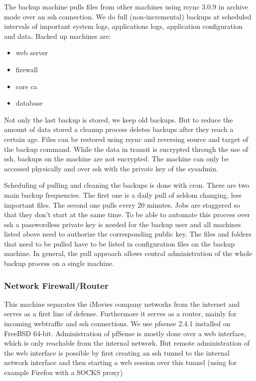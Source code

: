 \documentclass[english]{article}
\begin{document}
The backup machine pulls files from other machines using rsync 3.0.9 in archive mode over an ssh connection. We do full (non-incremental) backups at scheduled intervals of important system logs, applications logs, application configuration and data. Backed up machines are:

\begin{itemize}
    \item web server
    \item firewall
    \item core ca
    \item database
\end{itemize}

Not only the last backup is stored, we keep old backups. But to reduce the amount of data stored a cleanup process deletes backups after they reach a certain age. Files can be restored using rsync and reversing source and target of the backup command. 
While the data in transit is encrypted through the use of ssh, backups on the machine are not encrypted. The machine can only be accessed physically and over ssh with the private key of the sysadmin.

Scheduling of pulling and cleaning the backups is done with cron. There are two main backup frequencies. The first one is a daily pull of seldom changing, less important files. The second one pulls every 20 minutes. Jobs are staggered so that they don't start at the same time. To be able to automate this process over ssh a passwordless private key is needed for the backup user and all machines listed above need to authorize the corresponding public key.
The files and folders that need to be pulled have to be listed in configuration files on the backup machine. In general, the pull approach allows central administration of the whole backup process on a single machine.




\subsubsection{Network Firewall/Router}

This machine separates the iMovies company networks from the internet and serves as a first line of defense. Furthermore it serves as a router, mainly for incoming webtraffic and ssh connections. We use pfsense 2.4.1 installed on FreeBSD 64-bit. Administration of pfSense is mostly done over a web interface, which is only reachable from the internal network. But remote administration of the web interface is possible by first creating an ssh tunnel to the internal network interface and then starting a web session over this tunnel (using for example Firefox with a SOCKS proxy) 
\end{document}

